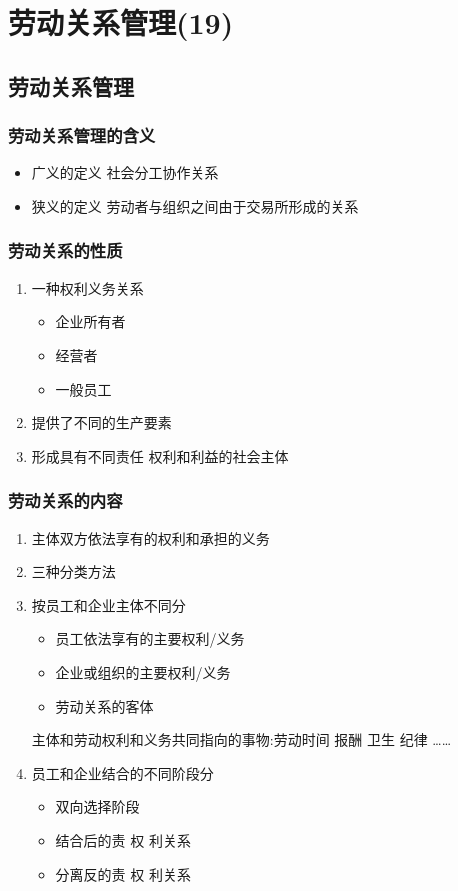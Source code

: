 \documentclass{ctexart}
\begin{document}
\section{劳动关系管理(19)}
\label{sec-3}
\subsection{劳动关系管理}
\label{sec-3-1}
\subsubsection{劳动关系管理的含义}
\label{sec-3-1-1}
\begin{itemize}
\item 广义的定义 社会分工协作关系
\item 狭义的定义 劳动者与组织之间由于交易所形成的关系
\end{itemize}
\subsubsection{劳动关系的性质}
\label{sec-3-1-2}
\begin{enumerate}
\item 一种权利义务关系
\label{sec-3-1-2-1}
\begin{itemize}
\item 企业所有者
\item 经营者
\item 一般员工
\end{itemize}
\item 提供了不同的生产要素
\label{sec-3-1-2-2}
\item 形成具有不同责任 权利和利益的社会主体
\label{sec-3-1-2-3}
\end{enumerate}
\subsubsection{劳动关系的内容}
\label{sec-3-1-3}
\begin{enumerate}
\item 主体双方依法享有的权利和承担的义务
\label{sec-3-1-3-1}
\item 三种分类方法
\label{sec-3-1-3-2}
\item 按员工和企业主体不同分
\label{sec-3-1-3-3}
\begin{itemize}
\item 员工依法享有的主要权利/义务
\item 企业或组织的主要权利/义务
\item 劳动关系的客体
\end{itemize}
主体和劳动权利和义务共同指向的事物:劳动时间 报酬 卫生 纪律 \ldots{}\ldots{}
\item 员工和企业结合的不同阶段分
\label{sec-3-1-3-4}
\begin{itemize}
\item 双向选择阶段
\item 结合后的责 权 利关系
\item 分离反的责 权 利关系
\end{itemize}
\end{enumerate}
\end{document}
